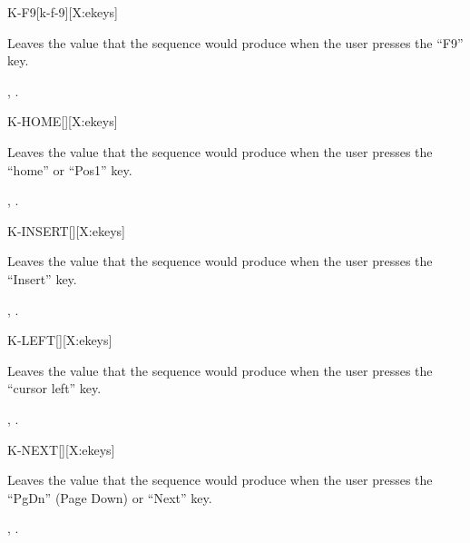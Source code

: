 \begin{worddef}{}{K-F9}[k-f-9][X:ekeys]
\item {}

	Leaves the value  that the sequence 
	 would produce when the user presses the
	``F9'' key.

\see {},
	.
\end{worddef}


\begin{worddef}{}{K-HOME}[][X:ekeys]
\item {}

	Leaves the value  that the sequence 
	 would produce when the user presses the
	``home'' or ``Pos1'' key.

\see {},
	.
\end{worddef}


\begin{worddef}{}{K-INSERT}[][X:ekeys]
\item {}

	Leaves the value  that the sequence 
	 would produce when the user presses the
	``Insert'' key.

\see {},
	.
\end{worddef}


\begin{worddef}{}{K-LEFT}[][X:ekeys]
\item {}

	Leaves the value  that the sequence 
	 would produce when the user presses the
	``cursor left'' key.

\see {},
	.
\end{worddef}


\begin{worddef}{}{K-NEXT}[][X:ekeys]
\item {}

	Leaves the value  that the sequence 
	 would produce when the user presses the
	``PgDn'' (Page Down) or ``Next'' key.

\see {},
	.
\end{worddef}


